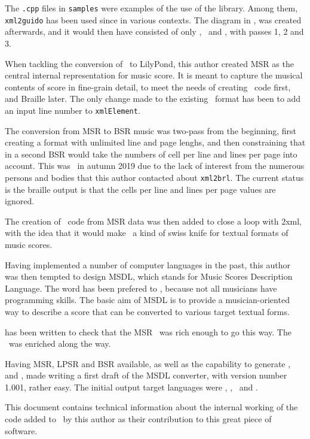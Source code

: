 The {\tt *.cpp} files in {\tt samples} were examples of the use of the library. Among them, {\tt xml2guido} has been used since in various contexts.
The diagram in , was created afterwards, and it would then have consisted of only \mxml, \mxsrRepr\ and \guido, with passes 1, 2 and 3.

When tackling the conversion of \mxml\ to LilyPond, this author created MSR as the central internal representation for music score. It is meant to capture the musical contents of score in fine-grain detail, to meet the needs of creating \lily\ code first, and Braille later.
The only change made to the existing \mxsrRepr\ format has been to add an input line number to {\tt xmlElement}.

The conversion from MSR to BSR music was two-pass from the beginning, first creating a \bsrRepr format with unlimited line and page lenghs, and then constraining that in a second BSR would take the numbers of cell per line and lines per page into account.
This was \frozen\ in autumn 2019 due to the lack of interest from the numerous persons and bodies that this author contacted about {\tt xml2brl}.
The current status is the braille output is that the cells per line and lines per page values are ignored.

The creation of \mxml\ code from MSR data was then added to close a loop with \mxml2xml, with the idea that it would make \mf\ a kind of swiss knife for textual formats of music scores.

Having implemented a number of computer languages in the past, this author was then tempted to design MSDL, which stands for Music Scores Description Language. The word  has been prefered to , because not all musicians have programming skills.
The basic aim of MSDL is to provide a musician-oriented way to describe a score that can be converted to various target textual forms.

 has been written to check that the MSR \API\ was rich enough to go this way. The \API\ was enriched along the way.

Having MSR, LPSR and BSR available, as well as the capability to generate \mxml, \lily\, \guido and \braille, made writing a first draft of the MSDL converter, with version number 1.001, rather easy. The initial output target languages were \mxml, \lily, \mxml\ and \braille.

This document contains technical information about the internal working of the code added to \mf\ by this author as their contribution to this great piece of software.


